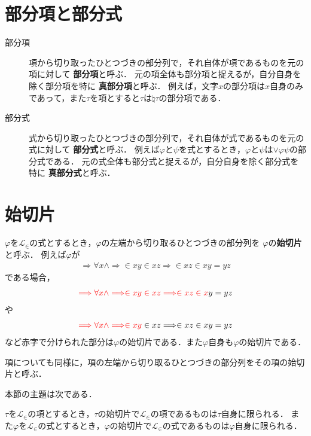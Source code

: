\section{部分項と部分式}
	\begin{description}
		\item[部分項]
			項から切り取ったひとつづきの部分列で，それ自体が項であるものを元の項に対して
			{\bf 部分項}と呼ぶ．
			元の項全体も部分項と捉えるが，自分自身を除く部分項を特に
			{\bf 真部分項}と呼ぶ．
			例えば，文字$x$の部分項は$x$自身のみであって，また$\tau$を項とすると$\tau$は$\natural \tau$の部分項である．
		
		\item[部分式]
			式から切り取ったひとつづきの部分列で，それ自体が式であるものを元の式に対して
			{\bf 部分式}と呼ぶ．
			例えば$\varphi$と$\psi$を式とするとき，$\varphi$と$\psi$は$\vee \varphi \psi$の部分式である．
			元の式全体も部分式と捉えるが，自分自身を除く部分式を特に
			{\bf 真部分式}と呼ぶ．
	\end{description}
	
\section{始切片}
	$\varphi$を$\mathcal{L}_{\in}$の式とするとき，$\varphi$の左端から切り取るひとつづきの部分列を
	$\varphi$の{\bf 始切片}と呼ぶ．
	例えば$\varphi$が
	\begin{align}
		\Longrightarrow \forall x \wedge \Longrightarrow \in xy \in xz \Longrightarrow \in xz \in xy = yz
	\end{align}
	である場合，
	\begin{align}
		\textcolor{red}{\Longrightarrow \forall x \wedge \Longrightarrow \in xy \in xz \Longrightarrow \in xz \in x}y = yz
	\end{align}
	や
	\begin{align}
		\textcolor{red}{\Longrightarrow \forall x \wedge \Longrightarrow \in xy} \in xz \Longrightarrow \in xz \in xy = yz
	\end{align}
	など赤字で分けられた部分は$\varphi$の始切片である．また$\varphi$自身も$\varphi$の始切片である．
	
	項についても同様に，項の左端から切り取るひとつづきの部分列をその項の始切片と呼ぶ．
	
	本節の主題は次である．
	\begin{screen}
		\begin{metathm}[始切片の一意性]\label{metathm:initial_segment_L_in}
			$\tau$を$\mathcal{L}_{\in}$の項とするとき，$\tau$の始切片で$\mathcal{L}_{\in}$の項であるものは$\tau$自身に限られる．
			また$\varphi$を$\mathcal{L}_{\in}$の式とするとき，$\varphi$の始切片で$\mathcal{L}_{\in}$の式であるものは$\varphi$自身に限られる．
		\end{metathm}
	\end{screen}
	
